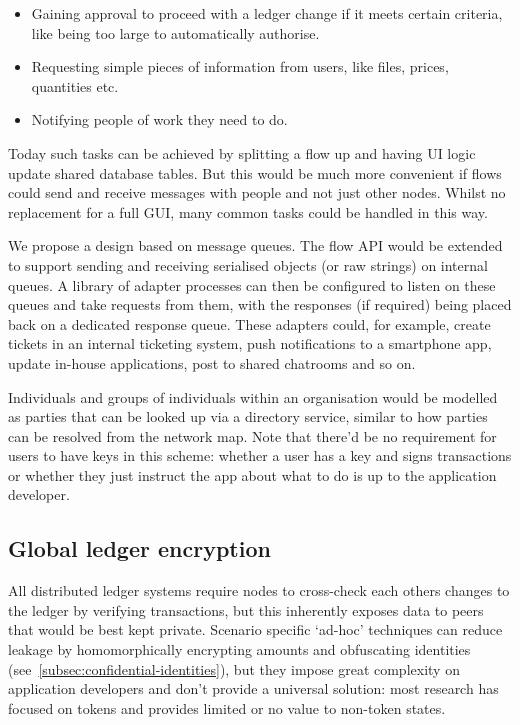 \documentclass{article}
\begin{document}
\begin{itemize}
    \item Gaining approval to proceed with a ledger change if it meets certain criteria, like being too large
          to automatically authorise.
    \item Requesting simple pieces of information from users, like files, prices, quantities etc.
    \item Notifying people of work they need to do.
\end{itemize}

Today such tasks can be achieved by splitting a flow up and having UI logic update shared database tables. But
this would be much more convenient if flows could send and receive messages with people and not just other nodes.
Whilst no replacement for a full GUI, many common tasks could be handled in this way.

We propose a design based on message queues. The flow API would be extended to support sending and receiving serialised
objects (or raw strings) on internal queues. A library of adapter processes can then be configured to listen on these
queues and take requests from them, with the responses (if required) being placed back on a dedicated response queue.
These adapters could, for example, create tickets in an internal ticketing system, push notifications to a smartphone
app, update in-house applications, post to shared chatrooms and so on.

Individuals and groups of individuals within an organisation would be modelled as parties that can be looked up via a
directory service, similar to how parties can be resolved from the network map. Note that there'd be no requirement
for users to have keys in this scheme: whether a user has a key and signs transactions or whether they just instruct
the app about what to do is up to the application developer.

\subsection{Global ledger encryption}\label{subsec:global-ledger-encryption}

All distributed ledger systems require nodes to cross-check each others changes to the ledger by verifying
transactions, but this inherently exposes data to peers that would be best kept private. Scenario specific
`ad-hoc' techniques can reduce leakage by homomorphically encrypting amounts and obfuscating identities
(see~\cref{subsec:confidential-identities}), but they impose great complexity on application developers and
don't provide a universal solution: most research has focused on tokens and provides limited or no value to
non-token states.
\end{document}
